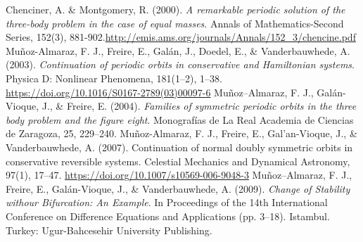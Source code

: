 \documentclass{article}
\begin{document}
\begin{thebibliography}{99}
   Chenciner, A. \& Montgomery, R. (2000). \textit{A remarkable periodic solution of the three-body problem in the case of equal masses}. Annals of Mathematics-Second Series, 152(3), 881-902.\url{http://emis.ams.org/journals/Annals/152_3/chencine.pdf}
 Mu\~{n}oz-Almaraz, F. J., Freire, E., Gal\'an,
  J., Doedel, E., \& Vanderbauwhede, A. (2003). \textit{Continuation of
  periodic orbits in conservative and Hamiltonian systems}. Physica D:
  Nonlinear Phenomena, 181(1–2),
  1–38. \url{https://doi.org/10.1016/S0167-2789(03)00097-6}
  Mu\~noz–Almaraz, F. J., Gal\'an-Vioque, J., \& Freire, E. (2004). \textit{Families of symmetric periodic orbits in the three body problem and the figure eight}. Monograf\'ias de La Real Academia de Ciencias de Zaragoza, 25, 229–240.
   Mu\~noz-Almaraz, F. J., Freire, E., Gal'an-Vioque,
  J., \& Vanderbauwhede, A. (2007). Continuation of normal doubly
  symmetric orbits in conservative reversible systems. Celestial
  Mechanics and Dynamical Astronomy, 97(1),
  17–47. \url{https://doi.org/10.1007/s10569-006-9048-3}
  Mu\~noz–Almaraz, F. J., Freire, E., Gal\'an-Vioque, J., \& Vanderbauwhede, A. (2009). \textit{Change of Stability withour Bifurcation: An Example}. In Proceedings of the 14th International Conference on Difference Equations and Applications (pp. 3–18). Istambul. Turkey: Ugur-Bahcesehir University Publishing.
\end{thebibliography}
\end{document}
